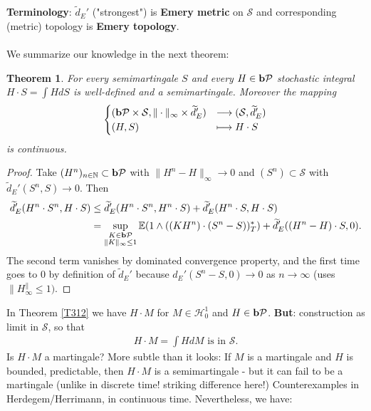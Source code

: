 \documentclass[12pt,a4paper, twoside]{article}
\newtheorem{thm}{Theorem}[section]
\theoremstyle{definition}
\newcommand{\EE}{\mathbb{E}} %
\newcommand{\pred}{\textbf{\text{b}}\mathcal{P}}
\begin{document}
\\
\\
\textbf{Terminology}: $\widetilde{d}_E'$ ("strongest") is \textbf{Emery metric} on $\mathcal{S}$ and corresponding (metric) topology is \textbf{Emery topology}.
\\\\
We summarize our knowledge in the next theorem:
\begin{thm}\label{T313} For every semimartingale $S$ and every $H \in \pred$ stochastic integral $H \cdot S= \int H dS$ is well-defined and a semimartingale. Moreover  the mapping 
\begin{align*}
\begin{cases} ( \pred \times \mathcal{S}, \| \cdot \|_\infty \times \widetilde{d}_E') & \longrightarrow ( \mathcal{S}, \widetilde{d}_E') \\
(H, S) & \longmapsto H \cdot S
 \end{cases}
\end{align*}
is continuous. 
\end{thm}
\begin{proof}
Take $(H^n)_{n \in \mathbb{N}} \subset \pred$ with $\|H^n-H\|_\infty \to 0$ and $(S^n) \subset \mathcal{S}$ with $\widetilde{d}_E'(S^n,S) \to 0$. Then  
\begin{align*}
\widetilde{d}_E'(H^n \cdot S^n, H \cdot S) &\leq \widetilde{d}_E'(H^n \cdot S^n , H^n \cdot S) + \widetilde{d}_E'(H^n \cdot S, H \cdot S) \\
& = \sup_{ \substack{ K \in \pred \\ \|K\|_\infty \leq 1}} \EE(1 \wedge ((KH^n) \cdot (S^n-S))_T^*) + \widetilde{d}_E'((H^n-H) \cdot S, 0).
\end{align*}
The second term vanishes by dominated convergence property, and the first time goes to $0$ by definition of $\widetilde{d}_E'$ because $d_E'(S^n-S, 0) \to 0$ as $n \to \infty$ (uses $\|H^\|_\infty \leq 1)$. 
\end{proof}
\newpage
In Theorem \ref{T312} we have $H \cdot M$ for $M \in \mathcal{H}_0^1$ and $H \in \pred$. \textbf{But}: construction as limit in $\mathcal{S}$, so that  
\begin{align*}
H \cdot M = \int H dM \text{ is in } \mathcal{S}.
\end{align*}
Is $H \cdot M$ a martingale? More subtle than it looks: If $M$ is a martingale and $H$ is bounded, predictable, then $H \cdot M$ is a semimartingale - but it can fail to be a martingale (unlike in discrete time! striking difference here!) Counterexamples in Herdegem/Herrimann, in continuous time. Nevertheless, we have:
\end{document}
